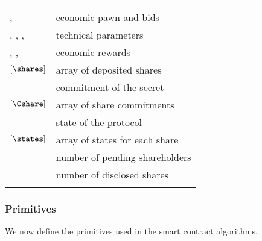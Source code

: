 \begin{tabular}{ll}
	& \\
	
	\PO, \BH & economic pawn and bids \\
	\td, \te, \N, \K & technical parameters \\
	\RH, \Wsecret, \Wshare & economic rewards \\
	$\left[ \shares \right]$ & array of deposited shares \\
	\Csecret & commitment of the secret \\
	$\left[ \Cshare \right]$ & array of share commitments \\	
	\state & state of the \shortname protocol \\
	$\left[ \states \right]$& array of states for each share \\
	\numpending & number of pending shareholders \\
	\numdisclosed & number of disclosed shares \\
	& \\
\end{tabular}

\subsubsection*{Primitives}
We now define the primitives used in the \shortname smart contract algorithms.

